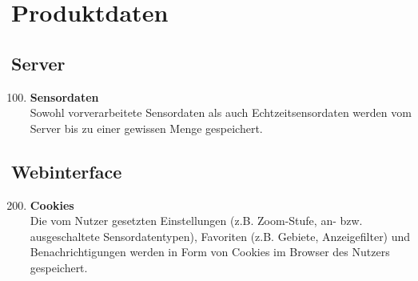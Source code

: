 \chapter{Produktdaten}
\section{Server}
\begin{enumerate}[label=\textbf{PD\arabic{enumi}0}]
	\setcounter{enumi}{99}
	\item \textbf{Sensordaten}\\
	Sowohl vorverarbeitete Sensordaten als auch Echtzeitsensordaten werden vom Server bis zu einer gewissen Menge gespeichert.
\end{enumerate}
\section{Webinterface}
\begin{enumerate}[label=\textbf{PD\arabic{enumi}0}]
	\setcounter{enumi}{199}
	\item \textbf{Cookies}\\
	Die vom Nutzer gesetzten Einstellungen (z.B. Zoom-Stufe, an- bzw. ausgeschaltete Sensordatentypen), Favoriten (z.B. Gebiete, Anzeigefilter) und Benachrichtigungen werden in Form von Cookies im Browser des Nutzers gespeichert.
\end{enumerate}